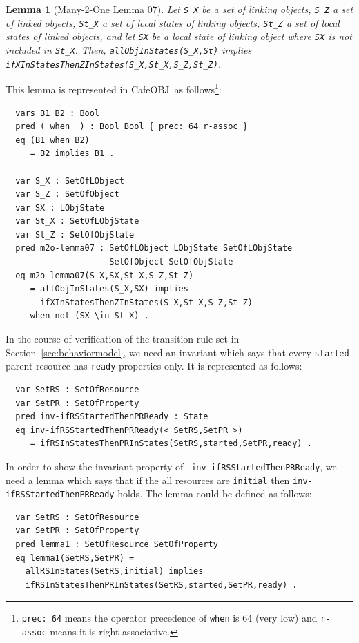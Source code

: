 \documentclass[12pt]{report}
\newtheorem{lemma}{Lemma}
\newcommand{\stt}[1]{{\small{\tt {#1}}}}
\newcommand{\cafeobj}{{\sf CafeOBJ}~}
\begin{document}
\begin{lemma}[Many-2-One Lemma 07]
  Let {\tt S\_X} be a set of linking objects, {\tt S\_Z} a set of
  linked objects, {\tt St\_X} a set of local states of linking
  objects, {\tt St\_Z} a set of local states of linked objects, and
  let {\tt SX} be a local state of linking object where {\tt SX} is not
  included in {\tt St\_X}. Then, \stt{allObjInStates(S\_X,St)} implies
  \stt{ifXInStatesThenZInStates(S\_X,St\_X,S\_Z,St\_Z)}.
\end{lemma}
This lemma is represented in \cafeobj as follows\footnote{\stt{prec:~64} 
means the operator precedence of {\tt when} is 64 (very low) and 
{\tt r-assoc} means it is right associative.}:
\small
\begin{verbatim}
  vars B1 B2 : Bool
  pred (_when _) : Bool Bool { prec: 64 r-assoc }
  eq (B1 when B2)
     = B2 implies B1 .

  var S_X : SetOfLObject
  var S_Z : SetOfObject
  var SX : LObjState
  var St_X : SetOfLObjState
  var St_Z : SetOfObjState
  pred m2o-lemma07 : SetOfLObject LObjState SetOfLObjState 
                     SetOfObject SetOfObjState
  eq m2o-lemma07(S_X,SX,St_X,S_Z,St_Z)
     = allObjInStates(S_X,SX) implies 
       ifXInStatesThenZInStates(S_X,St_X,S_Z,St_Z)
     when not (SX \in St_X) .
\end{verbatim}
\normalsize
In the course of verification of the transition rule set in
Section~\ref{sec:behaviormodel}, we need an invariant which says that
every {\tt started} parent resource has {\tt ready} properties
only. It is represented as follows:
\small
\begin{verbatim}
  var SetRS : SetOfResource
  var SetPR : SetOfProperty
  pred inv-ifRSStartedThenPRReady : State
  eq inv-ifRSStartedThenPRReady(< SetRS,SetPR >)
     = ifRSInStatesThenPRInStates(SetRS,started,SetPR,ready) .
\end{verbatim}
\normalsize
In order to show the invariant property of {\tt
  inv-ifRSStartedThenPRReady}, we need a lemma which says that if the all
resources are {\tt initial} then {\tt inv-ifRSStartedThenPRReady}
holds.  The lemma could be defined as follows:
\small
\begin{verbatim}
  var SetRS : SetOfResource
  var SetPR : SetOfProperty
  pred lemma1 : SetOfResource SetOfProperty
  eq lemma1(SetRS,SetPR) =
    allRSInStates(SetRS,initial) implies
    ifRSInStatesThenPRInStates(SetRS,started,SetPR,ready) .
\end{verbatim}
\end{document}
